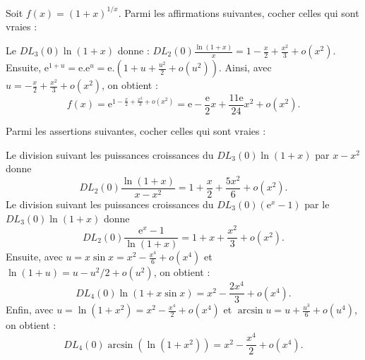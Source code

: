 \begin{question}
Soit $\displaystyle f(x)=(1+x)^{1/x}$. Parmi les affirmations suivantes, cocher celles qui sont vraies :
\begin{answers}
\end{answers}
\begin{explanations}
Le $\displaystyle DL_3(0)\ln (1+x)$ donne : $\displaystyle DL_2(0)\frac{\ln (1+x)}{x}=1-\frac{x}{2}+\frac{x^2}{3}+o(x^2)$.
\vskip0mm
Ensuite, $\mathrm{e}^{1+u}=\mathrm{e}.\mathrm{e}^u=\mathrm{e}.\left(1+u+\frac{u^2}{2}+o(u^2)\right)$. Ainsi, avec $\displaystyle u=-\frac{x}{2}+\frac{x^2}{3}+o(x^2)$, on obtient :
$$f(x)=\mathrm{e}^{1-\frac{x}{2}+\frac{x^2}{3}+o(x^2)}=\mathrm{e}-\frac{\mathrm{e}}{2}x+\frac{11\mathrm{e}}{24}x^2+o(x^2).$$
\end{explanations}
\end{question}

\begin{question}
Parmi les assertions suivantes, cocher celles qui sont vraies :
\begin{answers}
\end{answers}
\begin{explanations}
Le division suivant les puissances croissances du $\displaystyle DL_3(0)\ln (1+x)$ par $x-x^2$ donne
$$DL_2(0)\frac{\ln (1+x)}{x-x^2}=1+\frac{x}{2}+\frac{5x^2}{6}+o(x^2).$$
Le division suivant les puissances croissances du $\displaystyle DL_3(0)(\mathrm{e}^x-1)$ par le $\displaystyle DL_3(0)\ln (1+x)$ donne
$$DL_2(0)\frac{\mathrm{e}^x-1}{\ln (1+x)}=1+x+\frac{x^2}{3}+o(x^2).$$
Ensuite, avec $\displaystyle u=x\sin x =x^2-\frac{x^4}{6}+o(x^4)$ et $\ln (1+u)=u-u^2/2+o(u^2)$, on obtient :
$$DL_4(0)\ln (1+x\sin x)=x^2-\frac{2x^4}{3}+o(x^4).$$
Enfin, avec $\displaystyle u=\ln (1+x^2)=x^2-\frac{x^4}{2}+o(x^4)$ et $\arcsin u=u+\frac{u^3}{6}+o(u^4)$, on obtient :
$$DL_4(0)\arcsin \left(\ln (1+x^2)\right)=x^2-\frac{x^4}{2}+o(x^4).$$
\end{explanations}
\end{question}

